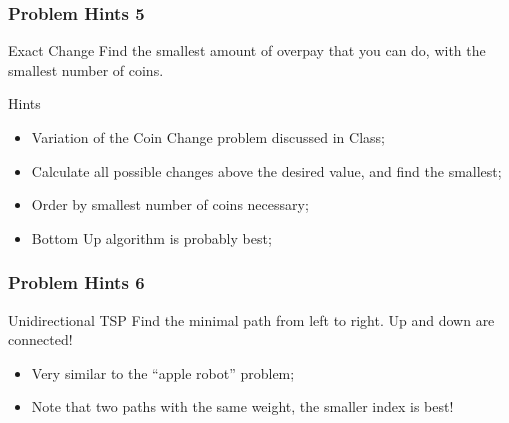 \begin{frame}
  \frametitle{Problem Hints 5}
  \begin{block}{Exact Change}
    Find the smallest amount of overpay that you can do, with the
    smallest number of coins.
  \end{block}

  \bigskip
  Hints
  \begin{itemize}
  \item Variation of the Coin Change problem discussed in Class;
  \item Calculate all possible changes above the desired value, and find the smallest;
  \item Order by smallest number of coins necessary;
  \item Bottom Up algorithm is probably best;
  \end{itemize}
\end{frame}

\begin{frame}
  \frametitle{Problem Hints 6}
  \begin{block}{Unidirectional TSP}
    Find the minimal path from left to right. Up and down are connected!
  \end{block}

  \bigskip

  \begin{itemize}
  \item Very similar to the ``apple robot'' problem;
  \item Note that two paths with the same weight, the smaller index is best!
  \end{itemize}
\end{frame}


